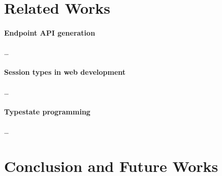 \documentclass[submission,copyright,creativecommons]{eptcs}
\begin{document}
\section{Related Works}

\paragraph{Endpoint API generation} \dots


\paragraph{Session types in web development} \dots

\paragraph{Typestate programming} \dots

\section{Conclusion and Future Works}
\end{document}
